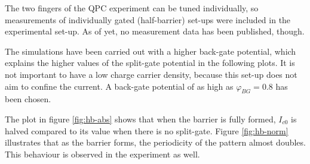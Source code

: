 The two fingers of the QPC experiment can be tuned individually, so measurements of individually gated (half-barrier) set-ups  were included in the experimental set-up. As of yet, no measurement data has been published, though.

The simulations have been carried out with a higher back-gate potential, which explains the higher values of the split-gate potential in the following plots. It is not important to have a low charge carrier density, because this set-up does not aim to confine the current. A back-gate potential of as high as $\varphi_{BG} = 0.8$ has been chosen.

The plot in figure \ref{fig:hb-abs} shows that when the barrier is fully formed, $I_{c0}$ is halved compared to its value when there is no split-gate. Figure \ref{fig:hb-norm} illustrates that as the barrier forms, the periodicity of the pattern almost doubles. This behaviour is observed in the experiment as well.

